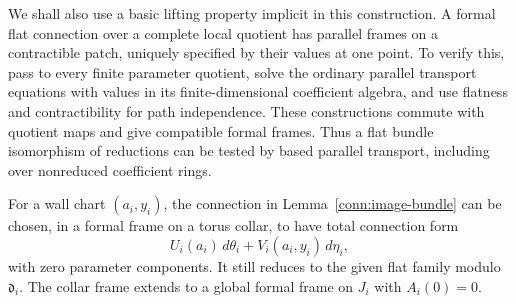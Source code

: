 We shall also use a basic lifting property implicit in this
construction.  A formal flat connection over a complete local
quotient has parallel frames on a contractible patch, uniquely
specified by their values at one point.  To verify this, pass
to every finite parameter quotient, solve the ordinary parallel
transport equations with values in its finite-dimensional
coefficient algebra, and use flatness and contractibility for
path independence.  These constructions commute with quotient
maps and give compatible formal frames.  Thus a flat bundle
isomorphism of reductions can be tested by based parallel
transport, including over nonreduced coefficient rings.

\begin{lemma}
\label{conn:wall-collar}
For a wall chart \((a_i,y_i)\), the connection in
Lemma~\ref{conn:image-bundle} can be chosen, in a formal frame on
a torus collar, to have total connection form
\begin{equation}
 U_i(a_i)\,d\theta_i+V_i(a_i,y_i)\,d\eta_i ,
 \label{conn:collar}
\end{equation}
with zero parameter components.  It still reduces to the given
flat family modulo \(\mathfrak d_i\).  The collar frame extends
to a global formal frame on \(J_i\) with \(A_i(0)=0\).
\end{lemma}

